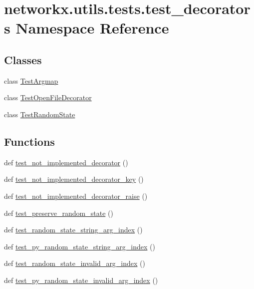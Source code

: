 \hypertarget{namespacenetworkx_1_1utils_1_1tests_1_1test__decorators}{}\section{networkx.\+utils.\+tests.\+test\+\_\+decorators Namespace Reference}
\label{namespacenetworkx_1_1utils_1_1tests_1_1test__decorators}
\subsection*{Classes}
\begin{DoxyCompactItemize}
\item 
class \hyperlink{classnetworkx_1_1utils_1_1tests_1_1test__decorators_1_1TestArgmap}{Test\+Argmap}
\item 
class \hyperlink{classnetworkx_1_1utils_1_1tests_1_1test__decorators_1_1TestOpenFileDecorator}{Test\+Open\+File\+Decorator}
\item 
class \hyperlink{classnetworkx_1_1utils_1_1tests_1_1test__decorators_1_1TestRandomState}{Test\+Random\+State}
\end{DoxyCompactItemize}
\subsection*{Functions}
\begin{DoxyCompactItemize}
\item 
def \hyperlink{namespacenetworkx_1_1utils_1_1tests_1_1test__decorators_a7cf9b543e491eb322f71f574be37a8de}{test\+\_\+not\+\_\+implemented\+\_\+decorator} ()
\item 
def \hyperlink{namespacenetworkx_1_1utils_1_1tests_1_1test__decorators_a635c0f603b7dea73b9cb2273c88f2b3a}{test\+\_\+not\+\_\+implemented\+\_\+decorator\+\_\+key} ()
\item 
def \hyperlink{namespacenetworkx_1_1utils_1_1tests_1_1test__decorators_a1209234914ff8ba77c82b34247604213}{test\+\_\+not\+\_\+implemented\+\_\+decorator\+\_\+raise} ()
\item 
def \hyperlink{namespacenetworkx_1_1utils_1_1tests_1_1test__decorators_ad5de2fd0054ec54f17104f8fd5a32caa}{test\+\_\+preserve\+\_\+random\+\_\+state} ()
\item 
def \hyperlink{namespacenetworkx_1_1utils_1_1tests_1_1test__decorators_af18b5ebab93df04a3bd49a0e339c3a16}{test\+\_\+random\+\_\+state\+\_\+string\+\_\+arg\+\_\+index} ()
\item 
def \hyperlink{namespacenetworkx_1_1utils_1_1tests_1_1test__decorators_a6e319660f979260f87e48d92c25bd517}{test\+\_\+py\+\_\+random\+\_\+state\+\_\+string\+\_\+arg\+\_\+index} ()
\item 
def \hyperlink{namespacenetworkx_1_1utils_1_1tests_1_1test__decorators_aaa243278d8c897f475a412fb49d2b291}{test\+\_\+random\+\_\+state\+\_\+invalid\+\_\+arg\+\_\+index} ()
\item 
def \hyperlink{namespacenetworkx_1_1utils_1_1tests_1_1test__decorators_a10a04d4bd8bda796b7bd34b6a51f36e6}{test\+\_\+py\+\_\+random\+\_\+state\+\_\+invalid\+\_\+arg\+\_\+index} ()
\end{DoxyCompactItemize}


